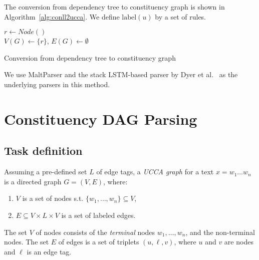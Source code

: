\documentclass[11pt]{article}
\begin{document}
The conversion from dependency tree to constituency graph is shown in Algorithm~\ref{alg:conll2ucca}. We define $\mathrm{label}(u)$ by a set of rules.

\begin{algorithm}
 $r \leftarrow Node()$\\
 $V(G) \leftarrow \{r\}$,
 $E(G) \leftarrow \emptyset$\\
 \caption{Conversion from dependency tree to constituency graph}
 \label{alg:conll2ucca}
\end{algorithm}

We use MaltParser \cite{nivre2007maltparser} and the stack LSTM-based parser by Dyer et al.~ as the underlying parsers in this method.

\section{Constituency DAG Parsing}\label{sec:direct_approach}

\subsection{Task definition}

Assuming a pre-defined set $L$ of edge tags, a \textit{UCCA graph} for a text $x=w_1 \ldots w_n$ is a directed graph $G=(V,E)$, where:
\begin{enumerate}
 \item $V$ is a set of nodes s.t. $\{w_1, \ldots, w_n\} \subseteq V$,
 \item $E \subseteq V \times L \times V$ is a set of labeled edges.
\end{enumerate}
The set $V$ of nodes consists of the \textit{terminal} nodes $w_1, \ldots, w_n$, and the non-terminal nodes. The set $E$ of edges is a set of triplets $(u, \ell, v)$, where $u$ and $v$ are nodes and $\ell$ is an edge tag.
\end{document}
